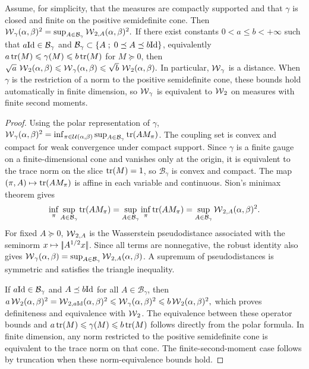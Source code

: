 \begin{prop}\label{prop-spectral-wasserstein-robust}
Assume, for simplicity, that the measures are compactly supported and that $\gamma$ is closed and finite on the positive semidefinite cone. Then
\(\operatorname{\mathcal{W}}_\gamma(\alpha,\beta)^2 = \sup_{A\in\mathcal B_\gamma} \operatorname{\mathcal{W}}_{2,A}(\alpha,\beta)^2.\)
If there exist constants $0<a\leq b<+\infty$ such that $a\mathrm{Id}\in\mathcal B_\gamma$ and $\mathcal B_\gamma\subset\left\{ A \;;\; 0\preceq A\preceq b\mathrm{Id} \right\}$, equivalently
$a\operatorname{tr}(M)\leqslant\gamma(M)\leqslant b\operatorname{tr}(M)$ for $M\succeq0$,
then
\(\sqrt a\,\operatorname{\mathcal{W}}_2(\alpha,\beta) \leqslant \operatorname{\mathcal{W}}_\gamma(\alpha,\beta) \leqslant \sqrt b\,\operatorname{\mathcal{W}}_2(\alpha,\beta).\)
In particular, $\operatorname{\mathcal{W}}_\gamma$ is a distance. When $\gamma$ is the restriction of a norm to the positive semidefinite cone, these bounds hold automatically in finite dimension, so $\operatorname{\mathcal{W}}_\gamma$ is equivalent to $\operatorname{\mathcal{W}}_2$ on measures with finite second moments.
\end{prop}
\begin{proof}
Using the polar representation of $\gamma$,
$\operatorname{\mathcal{W}}_\gamma(\alpha,\beta)^2 = \inf_{\pi\in\mathcal{U}(\alpha,\beta)} \sup_{A\in\mathcal B_\gamma}\operatorname{tr}(AM_\pi)$.
The coupling set is convex and compact for weak convergence under compact support. Since $\gamma$ is a finite gauge on a finite-dimensional cone and vanishes only at the origin, it is equivalent to the trace norm on the slice $\operatorname{tr}(M)=1$, so $\mathcal B_\gamma$ is convex and compact. The map $(\pi,A)\mapsto\operatorname{tr}(AM_\pi)$ is affine in each variable and continuous. Sion's minimax theorem gives
\[
\inf_\pi\sup_{A\in\mathcal B_\gamma}\operatorname{tr}(AM_\pi)
=
\sup_{A\in\mathcal B_\gamma}\inf_\pi\operatorname{tr}(AM_\pi)
=
\sup_{A\in\mathcal B_\gamma}\operatorname{\mathcal{W}}_{2,A}(\alpha,\beta)^2.
\]
For fixed $A\succeq0$, $\operatorname{\mathcal{W}}_{2,A}$ is the Wasserstein pseudodistance associated with the seminorm $x\mapsto|\!| A^{1/2}x |\!|$. Since all terms are nonnegative, the robust identity also gives
$\operatorname{\mathcal{W}}_\gamma(\alpha,\beta) = \sup_{A\in\mathcal B_\gamma}\operatorname{\mathcal{W}}_{2,A}(\alpha,\beta)$.
A supremum of pseudodistances is symmetric and satisfies the triangle inequality.

If $a\mathrm{Id}\in\mathcal B_\gamma$ and $A\preceq b\mathrm{Id}$ for all $A\in\mathcal B_\gamma$, then
\(a\operatorname{\mathcal{W}}_2(\alpha,\beta)^2 = \operatorname{\mathcal{W}}_{2,a\mathrm{Id}}(\alpha,\beta)^2 \leqslant \operatorname{\mathcal{W}}_\gamma(\alpha,\beta)^2 \leqslant b\operatorname{\mathcal{W}}_2(\alpha,\beta)^2,\)
which proves definiteness and equivalence with $\operatorname{\mathcal{W}}_2$. The equivalence between these operator bounds and $a\operatorname{tr}(M)\leqslant\gamma(M)\leqslant b\operatorname{tr}(M)$ follows directly from the polar formula. In finite dimension, any norm restricted to the positive semidefinite cone is equivalent to the trace norm on that cone. The finite-second-moment case follows by truncation when these norm-equivalence bounds hold.
\end{proof}
